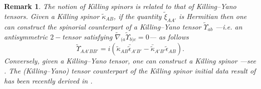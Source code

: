 \documentclass[10pt,a4paper]{article}
\theoremstyle{plain}
\newtheorem{remark}{Remark}
\def\bmg{{\bm g}}
\newcounter{mnotecount}%
\newcommand{\mnotex}[1]%
{\protect{\stepcounter{mnotecount}}$^{\mbox{\footnotesize $\bullet$\themnotecount}}$ 
\marginpar{%
\raggedright\tiny\em
$\!\!\!\!\!\!\,\bullet$\themnotecount: #1} }
\begin{document}
\begin{remark}
  \emph{ The notion of Killing spinors is related to that of
  Killing--Yano tensors. Given a Killing spinor $\tilde{\kappa}_{AB}$, if the quantity $\tilde{\xi}_{AA'}$ is
  Hermitian
  then
  one can construct the spinorial counterpart of a \emph{Killing--Yano
  tensor} $\tilde{\Upsilon}_{ab}$ ---i.e. an antisymmetric $2-$tensor
  satisfying $\tilde{\nabla}_{(a}\tilde{\Upsilon}_{b)c}=0$--- as
  follows
\[\tilde{\Upsilon}_{AA'BB'}=i(\tilde{\kappa}_{AB}\bar{\tilde{\epsilon}}_{A'B'}
-\bar{\tilde{\kappa}}_{A'B'}\tilde{\epsilon}_{AB}).\] 
Conversely,
given a Killing--Yano tensor, one can construct a Killing spinor
---see \cite{ValCol16,McLBer93,PenRin86}.  The (Killing--Yano) tensor
counterpart of the Killing spinor initial data result of \cite{GarVal08c}
has been recently derived in \cite{GarKha19a}.  }
\end{remark}
\end{document}
